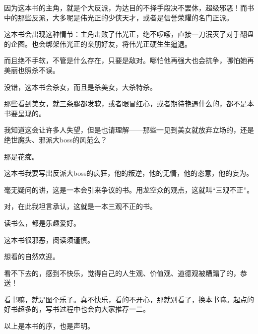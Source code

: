 \begin{this_body}
因为这本书的主角，就是个大反派，为达目的不择手段决不罢休，超级邪恶！而书中的那些反派，大多呢是伟光正的少侠天才，或者是信誉荣耀的名门正派。

这本书会出现这种情节：主角击败了伟光正，绝不啰嗦，直接一刀泯灭了对手翻盘的企图。也会绑架伟光正的亲朋好友，将伟光正硬生生逼退。

而且绝不手软，不管是什么存在，只要是敌对。哪怕他再强大也会抗争，哪怕她再美丽也照杀不误。

没错，这本书会杀女，而且是杀美女，大杀特杀。

那些看到美女，就三条腿都发软，或者眼冒红心，或者期待艳遇什么的，都不是本书要呈现的。

我知道这会让许多人失望，但是也请理解——那些一见到美女就放弃立场的，还是绝世魔头、邪派大boss的风范么？

那是花痴。

这本书我要写出反派大boss的疯狂，他的叛逆，他的无情，他的恣意，他的妄为。

毫无疑问的讲，这是一本会引来争议的书。用龙空众的观点，这就叫“三观不正”。

对，在此我坦言承认，这就是一本三观不正的书。

读书么，都是乐趣爱好。

这本书很邪恶，阅读须谨慎。

想看的自然欢迎。

看不下去的，感到不快乐，觉得自己的人生观、价值观、道德观被糟蹋了的，恭送！

看书嘛，就是图个乐子。真不快乐，看的不开心，那就别看了，换本书嘛。起点的好书超多的，写书过程中也会向大家推荐一二。

以上是本书的序，也是声明。

\end{this_body}
